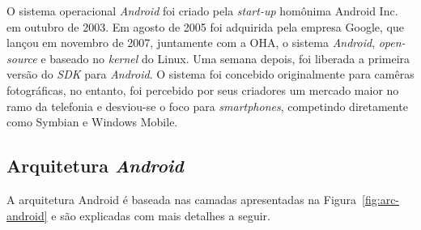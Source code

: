 O sistema operacional \textit{Android} foi criado pela \textit{start-up} homônima Android Inc. em outubro de 2003. Em agosto de 2005 foi adquirida pela empresa Google, que lançou
em novembro de 2007, juntamente com a OHA, o sistema \textit{Android}, \textit{open-source} e baseado no \textit{kernel} do Linux. Uma semana depois, foi liberada a primeira versão do \textit{SDK} para \textit{Android}.
O sistema foi concebido originalmente para camêras fotográficas, no entanto, foi percebido por seus criadores um mercado maior no ramo da telefonia e desviou-se o 
foco para \textit{smartphones}, competindo diretamente como Symbian e Windows Mobile.

\subsection{Arquitetura \textit{Android}} \label{subsec:arc-android}

A arquitetura Android é baseada nas camadas apresentadas na Figura~\ref{fig:arc-android} e são explicadas com mais detalhes a seguir.

